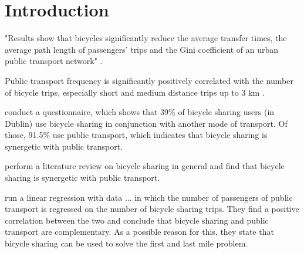 \clearpage
\section{Introduction}
\label{sec:introduction}





"Results show that bicycles significantly reduce the average transfer times, the average path length of passengers’ trips and the Gini coefficient of an urban public transport network" \cite{yangImpactPublicBicyclesharing2018}.

Public transport frequency is significantly positively correlated with the number of bicycle trips, especially short and medium distance trips up to 3 km \cite{radzimskiExploringRelationshipBikesharing2021a}.

\cite{murphyRoleBicyclesharingCity2015} conduct a questionnaire, which shows that 39\% of bicycle sharing users (in Dublin) use bicycle sharing in conjunction with another mode of transport. Of those, 91.5\% use public transport, which indicates that bicycle sharing is synergetic with public transport.

\cite{fishmanBikeShareSynthesis2013} perform a literature review on bicycle sharing in general and find that bicycle sharing is synergetic with public transport.

\cite{maBicycleSharingPublic2015} run a linear regression with data ...
in which the number of passengers of public transport is regressed on the number of bicycle sharing trips.
They find a positive correlation between the two and conclude that bicycle sharing and public transport are complementary.
As a possible reason for this, they state that bicycle sharing can be used to solve the first and last mile problem.



